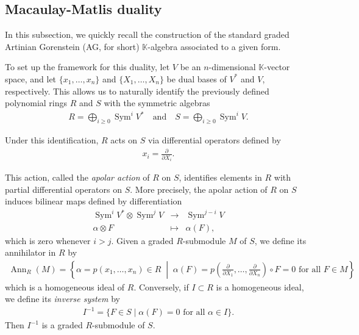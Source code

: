 \documentclass[12pt,twoside]{amsart}
\numberwithin{equation}{section} \hyphenation{semi-stable}
\newcommand{\K}{\mathbb{K}}
\theoremstyle{definition}
\begin{document}
\subsection{Macaulay-Matlis duality} In this subsection, we quickly recall the construction of the standard graded Artinian Gorenstein (AG, for short) $\K$-algebra
associated to a given form.

To set up the framework for this duality, let $V$ be an $n$-dimensional $\mathbb{K}$-vector space, and let $\{x_1, \dots, x_n\}$ and $\{X_1, \dots, X_n\}$ be dual bases of $V^{\ast}$ and $V$, respectively. This allows us to naturally identify the previously defined polynomial rings $R$ and $S$ with the symmetric algebras
\begin{eqnarray*}
R=\bigoplus_{i \geq 0} \operatorname{Sym}^i V^{\ast}
\quad \text{and} \quad
S=\bigoplus_{i \geq 0} \operatorname{Sym}^i V .
\end{eqnarray*}

Under this identification, $R$ acts on $S$ via differential operators defined by 
\begin{eqnarray*}
x_i = \frac{\partial}{\partial X_i}.
\end{eqnarray*}

This action, called the \emph{apolar action} of $R$ on $S$, identifies elements in $R$ with partial differential operators on $S$. More precisely,  the apolar action of $R$ on $S$ induces bilinear maps defined by differentiation 
\begin{eqnarray*}
\operatorname{Sym}^i V ^{\ast}\otimes \operatorname{Sym}^j V
&\longrightarrow& 
\operatorname{Sym}^{j-i} V\\
\alpha \otimes F &\longmapsto& \alpha(F),
\end{eqnarray*}
which is zero whenever $i>j$. Given a graded $R$-submodule $M$ of $S$, we define its annihilator in $R$ by
\begin{eqnarray*}
\operatorname{Ann}_R(M)
=
\left\{
\alpha = p(x_1,\dots,x_n) \in R
\;\middle|\;
\alpha(F)
=
p\!\left(\frac{\partial}{\partial X_1}, \dots, \frac{\partial}{\partial X_n}\right) \circ  F = 0 \text{ for all } F \in M
\right\}
\end{eqnarray*}
which is a homogeneous  ideal of $R$. Conversely, if $I \subset R$ is a homogeneous ideal, we define its \emph{inverse system} by
\begin{eqnarray*}
I^{-1}
=
\{F \in S \mid \alpha(F)=0 \text{ for all } \alpha \in I\}.
\end{eqnarray*}
Then $I^{-1}$ is a graded $R$-submodule of $S$.
\end{document}
